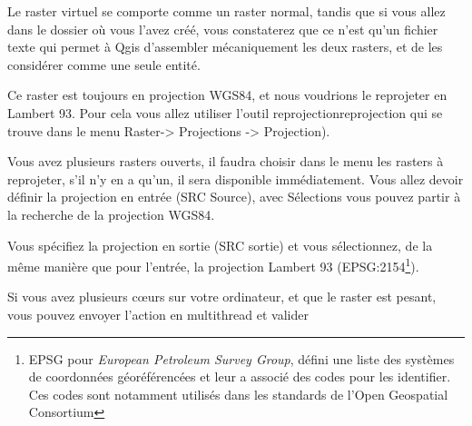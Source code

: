 \documentclass[a4paper, 11pt]{article}
\begin{document}
    Le raster virtuel se comporte comme un raster normal, tandis que si vous allez dans le dossier où vous l'avez créé, vous constaterez que ce n'est qu'un fichier texte qui permet à Qgis d'assembler mécaniquement les deux rasters, et de les considérer comme une seule entité.

    Ce raster est toujours en projection WGS84, et nous voudrions le reprojeter en Lambert 93. Pour cela vous allez utiliser l'outil reprojectionreprojection qui se trouve dans le menu Raster-> Projections -> Projection).

    Vous avez plusieurs rasters ouverts, il faudra choisir dans le menu les rasters à reprojeter, s'il n'y en a qu'un, il sera disponible immédiatement. Vous allez devoir définir la projection en entrée (SRC Source), avec Sélections vous pouvez partir à la recherche de la projection WGS84.

    Vous spécifiez la projection en sortie (SRC sortie) et vous sélectionnez, de la même manière que pour l'entrée, la projection Lambert 93 (EPSG:2154\footnote{EPSG pour \textit{European Petroleum Survey Group}, défini une liste des systèmes de coordonnées géoréférencées et leur a associé des codes pour les identifier. Ces codes sont notamment utilisés dans les standards de l'Open Geospatial Consortium}).

    Si vous avez plusieurs cœurs sur votre ordinateur, et que le raster est pesant, vous pouvez envoyer l'action en multithread et valider
\end{document}
